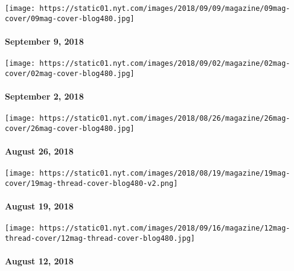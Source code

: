 \href{https://www.nytimes.com/issue/magazine/2018/09/06/the-9918-issue}{}

\texttt{[image: https://static01.nyt.com/images/2018/09/09/magazine/09mag-cover/09mag-cover-blog480.jpg]}

\hypertarget{september-9-2018}{%
\paragraph{September 9, 2018}\label{september-9-2018}}

\href{https://www.nytimes.com/issue/magazine/2018/09/04/the-9218-issue}{}

\texttt{[image: https://static01.nyt.com/images/2018/09/02/magazine/02mag-cover/02mag-cover-blog480.jpg]}

\hypertarget{september-2-2018}{%
\paragraph{September 2, 2018}\label{september-2-2018}}

\href{https://www.nytimes.com/issue/magazine/2018/08/24/the-82618-issue}{}

\texttt{[image: https://static01.nyt.com/images/2018/08/26/magazine/26mag-cover/26mag-cover-blog480.jpg]}

\hypertarget{august-26-2018}{%
\paragraph{August 26, 2018}\label{august-26-2018}}

\href{https://www.nytimes.com/issue/magazine/2018/08/24/the-81918-issue}{}

\texttt{[image: https://static01.nyt.com/images/2018/08/19/magazine/19mag-cover/19mag-thread-cover-blog480-v2.png]}

\hypertarget{august-19-2018}{%
\paragraph{August 19, 2018}\label{august-19-2018}}

\href{https://www.nytimes.com/issue/magazine/2018/08/24/the-81218-issue}{}

\texttt{[image: https://static01.nyt.com/images/2018/09/16/magazine/12mag-thread-cover/12mag-thread-cover-blog480.jpg]}

\hypertarget{august-12-2018}{%
\paragraph{August 12, 2018}\label{august-12-2018}}

